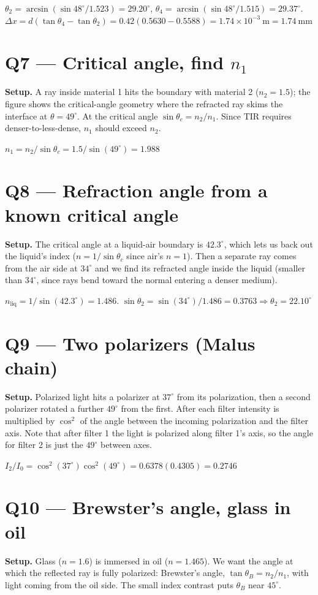 \documentclass[11pt]{article}
\begin{document}
$\theta_2 = \arcsin(\sin 48^\circ/1.523) = 29.20^\circ$, $\theta_4 = \arcsin(\sin 48^\circ/1.515) = 29.37^\circ$.
$\Delta x = d(\tan\theta_4 - \tan\theta_2) = 0.42(0.5630 - 0.5588) = 1.74\times 10^{-3}\ \text{m} = \boxed{1.74\ \text{mm}}$

\section*{Q7 --- Critical angle, find $n_1$}
\textbf{Setup.} A ray inside material 1 hits the boundary with material 2 ($n_2=1.5$); the figure shows the critical-angle geometry where the refracted ray skims the interface at $\theta=49^\circ$. At the critical angle $\sin\theta_c = n_2/n_1$. Since TIR requires denser-to-less-dense, $n_1$ should exceed $n_2$.

$n_1 = n_2/\sin\theta_c = 1.5/\sin(49^\circ) = \boxed{1.988}$

\section*{Q8 --- Refraction angle from a known critical angle}
\textbf{Setup.} The critical angle at a liquid-air boundary is $42.3^\circ$, which lets us back out the liquid's index ($n=1/\sin\theta_c$ since air's $n=1$). Then a separate ray comes from the air side at $34^\circ$ and we find its refracted angle inside the liquid (smaller than $34^\circ$, since rays bend toward the normal entering a denser medium).

$n_{\text{liq}} = 1/\sin(42.3^\circ) = 1.486$. $\sin\theta_2 = \sin(34^\circ)/1.486 = 0.3763 \Rightarrow \theta_2 = \boxed{22.10^\circ}$

\section*{Q9 --- Two polarizers (Malus chain)}
\textbf{Setup.} Polarized light hits a polarizer at $37^\circ$ from its polarization, then a second polarizer rotated a further $49^\circ$ from the first. After each filter intensity is multiplied by $\cos^2$ of the angle between the incoming polarization and the filter axis. Note that after filter 1 the light is polarized along filter 1's axis, so the angle for filter 2 is just the $49^\circ$ between axes.

$I_2/I_0 = \cos^2(37^\circ)\cos^2(49^\circ) = 0.6378(0.4305) = \boxed{0.2746}$

\section*{Q10 --- Brewster's angle, glass in oil}
\textbf{Setup.} Glass ($n=1.6$) is immersed in oil ($n=1.465$). We want the angle at which the reflected ray is fully polarized: Brewster's angle, $\tan\theta_B = n_2/n_1$, with light coming from the oil side. The small index contrast puts $\theta_B$ near $45^\circ$.
\end{document}
